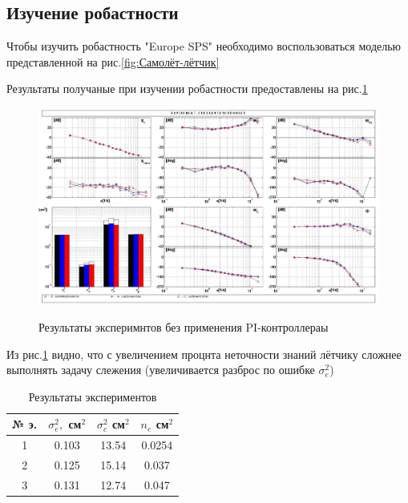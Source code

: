\subsection{Изучение робастности} 

Чтобы изучить робастность "Europe SPS" необходимо воспользоваться моделью представленной на рис.{\ref{fig:Самолёт-лётчик}}

Результаты получаные при изучении робастности предоставлены на рис.\ref{fig:Модель без PI}

\begin{figure}[H]
    \centering \includegraphics[width=\linewidth]{Оглавление/Part3/figures/Модель без PI.jpg}
    \caption{Результаты эксперимнтов без применения PI-контроллераы}
    {\label{fig:Модель без PI}}
\end{figure}
Из рис.{\ref{fig:Модель без PI}} видно, что с увеличением процнта неточности знаний лётчику сложнее выполнять задачу слежения 
(увеличивается разброс по ошибке $\sigma_e^2$)

\begin{table}[H]
    \caption{Результаты экспериментов}
    \centering
    \label{tab:Результаты экспериментов без PI}
    \begin{tabular}{|c|c|c|c|}
        \hline 
        № э.& $\sigma^2_e,$ см$^2$ & $\sigma^2_c$ см$^2$ & $n_e$ см$^2$ \\ \hline 
        1& 0.103 & 13.54 & 0.0254\\ \hline
        2& 0.125 & 15.14  & 0.037 \\ \hline
        3& 0.131 & 12.74 & 0.047\\ \hline

    \end{tabular}
\end{table}

